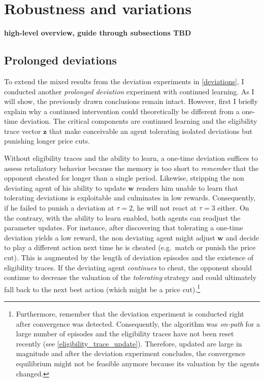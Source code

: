 \section{Robustness and variations}\label{robustness}

\textbf{high-level overview, guide through subsections TBD}

\subsection{Prolonged deviations}\label{prolonged_deviations}

To extend the mixed results from the deviation experiments in \autoref{deviations}, I conducted another \emph{prolonged deviation} experiment with continued learning. As I will show, the previously drawn conclusions remain intact. However, first I briefly explain why a continued intervention could theoretically be different from a one-time deviation. The critical components are continued learning and the eligibility trace vector $\boldsymbol{z}$ that make conceivable an agent tolerating isolated deviations but punishing longer price cuts.

Without eligibility traces and the ability to learn, a one-time deviation suffices to assess retaliatory behavior because the memory is too short to \emph{remember} that the opponent cheated for longer than a single period. Likewise, stripping the non deviating agent of his ability to update $\boldsymbol{w}$ renders him unable to learn that tolerating deviations is exploitable and culminates in low rewards. Consequently, if he failed to punish a deviation at $\tau = 2$, he will not react at $\tau = 3$ either. On the contrary, with the ability to learn enabled, both agents can readjust the parameter updates. For instance, after discovering that tolerating a one-time deviation yields a low reward, the non deviating agent might adjust $\boldsymbol{w}$ and decide to play a different action next time he is cheated (e.g.\ match or punish the price cut). This is augmented by the length of deviation episodes and the existence of eligibility traces. If the deviating agent \emph{continues} to cheat, the opponent should continue to decrease the valuation of the \emph{tolerating} strategy and could ultimately fall back to the next best action (which might be a price cut).\footnote{Furthermore, remember that the deviation experiment is conducted right after convergence was detected. Consequently, the algorithm was \emph{on-path} for a large number of episodes and the eligibility traces have not been reset recently (see \autoref{eligibility_trace_update}). Therefore, updated are large in magnitude and after the deviation experiment concludes, the convergence equilibrium might not be feasible anymore because its valuation by the agents changed.}

